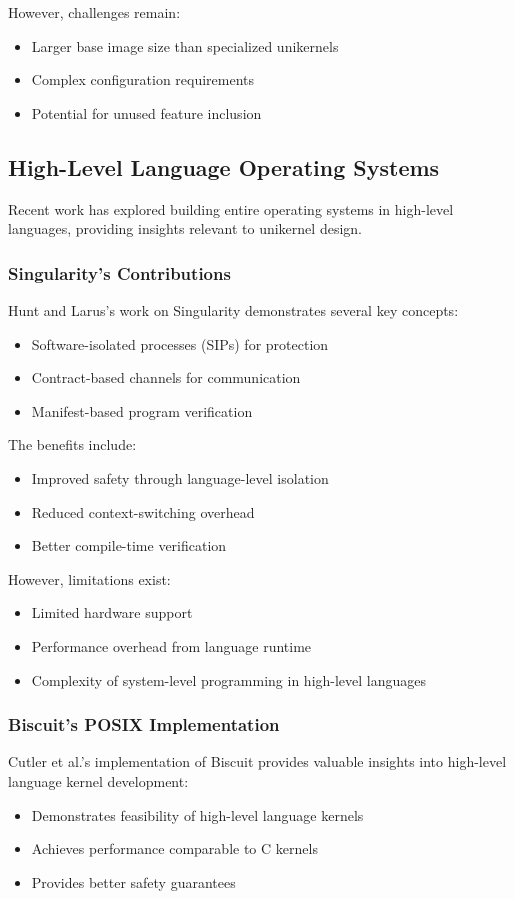 \documentclass[conference]{IEEEtran}
\begin{document}
However, challenges remain:
\begin{itemize}
	\item Larger base image size than specialized unikernels
	\item Complex configuration requirements
	\item Potential for unused feature inclusion
\end{itemize}

\subsection{High-Level Language Operating Systems}
Recent work has explored building entire operating systems in high-level languages, providing insights relevant to unikernel design.

\subsubsection{Singularity's Contributions}
Hunt and Larus's work on Singularity \cite{singularity} demonstrates several key concepts:
\begin{itemize}
	\item Software-isolated processes (SIPs) for protection
	\item Contract-based channels for communication
	\item Manifest-based program verification
\end{itemize}

The benefits include:
\begin{itemize}
	\item Improved safety through language-level isolation
	\item Reduced context-switching overhead
	\item Better compile-time verification
\end{itemize}

However, limitations exist:
\begin{itemize}
	\item Limited hardware support
	\item Performance overhead from language runtime
	\item Complexity of system-level programming in high-level languages
\end{itemize}

\subsubsection{Biscuit's POSIX Implementation}
Cutler et al.'s implementation of Biscuit \cite{go_kernel} provides valuable insights into high-level language kernel development:
\begin{itemize}
	\item Demonstrates feasibility of high-level language kernels
	\item Achieves performance comparable to C kernels
	\item Provides better safety guarantees
\end{itemize}
\end{document}
